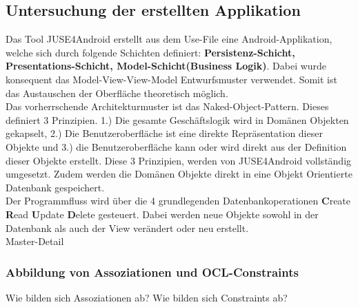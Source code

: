 \documentclass[a4paper,twoside]{article}
\begin{document}
\subsection{Untersuchung der erstellten Applikation}
Das Tool JUSE4Android erstellt aus dem Use-File eine Android-Applikation, welche sich durch folgende Schichten definiert: \textbf{Persistenz-Schicht, Presentations-Schicht, Model-Schicht(Business Logik)}. Dabei wurde konsequent das Model-View-View-Model Entwurfsmuster verwendet. Somit ist das Austauschen der Oberfläche theoretisch möglich.\\
Das vorherrschende Architekturmuster ist das Naked-Object-Pattern. Dieses definiert 3 Prinzipien. 1.) Die gesamte Geschäftslogik wird in Domänen Objekten gekapselt, 2.) Die Benutzeroberfläche ist eine direkte Repräsentation dieser Objekte und 3.) die Benutzeroberfläche kann oder wird direkt aus der Definition dieser Objekte erstellt. Diese 3 Prinzipien, werden von JUSE4Android vollständig umgesetzt. Zudem werden die Domänen Objekte direkt in eine Objekt Orientierte Datenbank gespeichert.\\
Der Programmfluss wird über die 4 grundlegenden Datenbankoperationen \textbf{C}reate \textbf{R}ead \textbf{U}pdate \textbf{D}elete gesteuert. Dabei werden neue Objekte sowohl in der Datenbank als auch der View verändert oder neu erstellt.\\
Master-Detail

\subsubsection{Abbildung von Assoziationen und OCL-Constraints}
Wie bilden sich Assoziationen ab?
Wie bilden sich Constraints ab?
\end{document}
